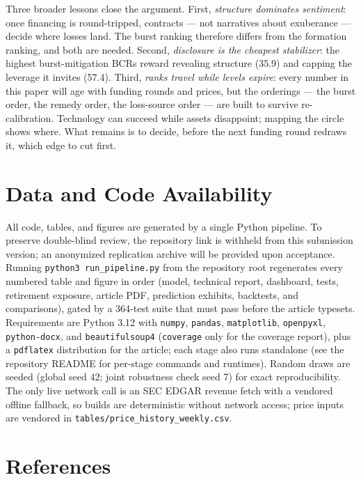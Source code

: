 \documentclass[11pt,a4paper]{article}
\begin{document}
Three broader lessons close the argument. First, \emph{structure dominates
sentiment}: once financing is round-tripped, contracts --- not narratives
about exuberance --- decide where losses land. The burst ranking therefore
differs from the formation ranking, and both are needed. Second,
\emph{disclosure is the cheapest stabilizer}: the highest burst-mitigation
BCRs reward revealing structure (35.9) and capping the leverage it invites
(57.4). Third, \emph{ranks travel while levels expire}: every number in
this paper will age with funding rounds and prices, but the orderings ---
the burst order, the remedy order, the loss-source order --- are built to
survive re-calibration. Technology can succeed while assets disappoint;
mapping the circle shows where. What remains is to decide, before the next
funding round redraws it, which edge to cut first.


\section*{Data and Code Availability}
All code, tables, and figures are generated by a single Python pipeline.
To preserve double-blind review, the repository link is withheld from this
submission version; an anonymized replication archive will be provided upon
acceptance. Running \texttt{python3 run\_pipeline.py} from the repository
root regenerates every
numbered table and figure in order (model, technical report, dashboard,
tests, retirement exposure, article PDF, prediction exhibits, backtests, and
comparisons), gated by a 364-test suite that must pass before the article
typesets. Requirements are Python 3.12 with \texttt{numpy}, \texttt{pandas},
\texttt{matplotlib}, \texttt{openpyxl}, \texttt{python-docx},
and \texttt{beautifulsoup4} (\texttt{coverage} only for the
coverage report), plus a \texttt{pdflatex} distribution for the article;
each stage also runs standalone (see the repository README for per-stage
commands and runtimes). Random draws are seeded (global seed 42; joint
robustness check seed 7) for exact reproducibility. The only live network
call is an SEC EDGAR revenue fetch with a vendored offline fallback, so
builds are deterministic without network access; price inputs are vendored
in \texttt{tables/price\_history\_weekly.csv}.



\renewcommand{\refname}{}
\section*{References}
\label{sec:references}
\end{document}
